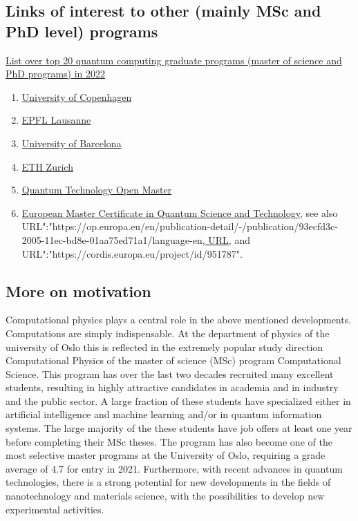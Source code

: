 \documentclass[%
oneside,                 %
final,                   %
10pt]{article}
\begin{document}
\subsection{Links of interest to other (mainly MSc and PhD level) programs}

\href{{https://thequantuminsider.com/2022/06/06/top-20-quantum-computing-masters-ph-d-programs-in-2022/}}{List over top 20 quantum computing graduate programs (master of science and PhD programs) in 2022}

\begin{enumerate}
\item \href{{https://www.math.ku.dk/english/about/news/quantum-information-science-programme/}}{University of Copenhagen}

\item \href{{https://thequantumhubs.com/epfl-offers-a-new-master-in-quantum-science-and-engineering/}}{EPFL Lausanne}

\item \href{{https://quantummasterbarcelona.eu/}}{University of Barcelona}

\item \href{{https://master-qe.ethz.ch/}}{ETH Zurich}

\item \href{{https://qtom.qtedu.eu/}}{Quantum Technology Open Master}

\item \href{{http://efeqt.eu/}}{European Master Certificate in Quantum Science and Technology}, see also URL":"https://op.europa.eu/en/publication-detail/-/publication/93ecfd3c-2005-11ec-bd8e-01aa75ed71a1/language-en\href{{https://www.eucor-uni.org/en/qustec/}}{, URL}, and URL":"https://cordis.europa.eu/project/id/951787".
\end{enumerate}

\noindent
\subsection{More on motivation}

Computational physics plays a central role in the above mentioned
developments.  Computations are simply indispensable.  At the
department of physics of the university of Oslo this is reflected in
the extremely popular study direction Computational Physics of the
master of science (MSc) program Computational Science. This program
has over the last two decades recruited many excellent students,
resulting in highly attractive candidates in academia and in industry
and the public sector. A large fraction of these students have
specialized either in artificial intelligence and machine learning
and/or in quantum information systems.  The large majority of the
these students have job offers at least one year before completing
their MSc theses. The program has also become one of the most
selective master programs at the University of Oslo, requiring a grade
average of 4.7 for entry in 2021. Furthermore, with recent advances in
quantum technologies, there is a strong potential for new developments
in the fields of nanotechnology and materials science, with the
possibilities to develop new experimental activities.
\end{document}
